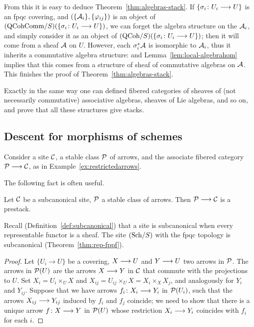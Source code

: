 \begin{4   STACKS}
\begin{4.2 Descent for quasi-coherent sheaves}
From this it is easy to deduce Theorem~\ref{thm:algebras-stack}. If $\{\sigma_{i}\colon U_{i} \arr U\}$ is an fpqc covering, and  $(\{\mathcal{A}_{i}\}, \{\varphi_{ij}\})$ is an object of $({\mathrm{QCohComm}/S})(\{\sigma_{i}\colon U_{i} \longrightarrow U\})$, we can forget the algebra structure on the $\mathcal{A}_{i}$, and simply consider it as an object of $({\mathrm{QCoh}/S})(\{\sigma_{i}\colon U_{i} \longrightarrow U\})$; then it will come from a \qc sheaf $\mathcal{A}$ on $U$. However, each $\sigma_{i}^{*}\mathcal{A}$ is isomorphic to $\mathcal{A}_{i}$, thus it inherits a commutative algebra structure: and Lemma~\ref{lem:local-algebrahom} implies that this comes from a structure of sheaf of commutative algebras on $\mathcal{A}$. This finishes the proof of Theorem~\ref{thm:algebras-stack}.

Exactly in the same way one can defined fibered categories of sheaves of (not necessarily commutative) associative algebras, sheaves of Lie algebras, and so on, and prove that all these structures give stacks.

\end{4.2 Descent for quasi-coherent sheaves}
\begin{4.3 Descent for morphisms of schemes}
\setcounter{section}{2}
\section{Descent for morphisms of schemes}
\label{sec:descent-morphisms}
\setcounter{theorem}{30}
Consider a site $\mathcal{C}$, a stable class $\mathcal{P}$ of arrows, and the associate fibered category  $\cP \arr \cC$, as in Example~\ref{ex:restrictedarrows}.

The following fact is often useful.

\begin{proposition}\label{prop:stable->prestack}
Let $\mathcal{C}$ be a subcanonical site, $\mathcal{P}$ a stable class of arrows. Then $\cP \arr \cC$ is a prestack.
\end{proposition}

Recall (Definition~\ref{def:subcanonical}) that a site is subcanonical when every representable functor is a sheaf. The site $({\mathrm{Sch}/S})$ with the fpqc topology is subcanonical (Theorem~\ref{thm:rep-fppf}).

\begin{proof}
Let $\{U_i \to U\}$ be a covering, $X \arr U$ and $Y \arr U$ two arrows in $\mathcal{P}$. The arrows in $\mathcal{P}(U)$ are the arrows $X \arr Y$ in $\mathcal{C}$ that commute with the projections to $U$. Set $X_i = U_i \times_U X$ and $X_{ij} = U_{ij}\times_U X = X_i \times_X X_j$, and analogously for $Y_i$ and $Y_{ij}$. Suppose that we have arrows $f_i \colon X_i \arr Y_i$ in $\mathcal{P}(U_i)$, such that the arrows $X_{ij} \arr Y_{ij}$ induced by $f_i$ and $f_j$ coincide; we need to show that there is a unique arrow $f \colon X \arr Y$ in $\mathcal{P}(U)$ whose restriction $X_i \arr Y_i$ coincides with $f_i$ for each $i$.


\end{proof}
\end{4.3 Descent for morphisms of schemes}
\end{4   STACKS}
